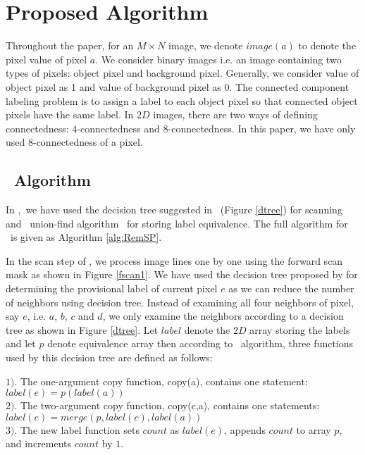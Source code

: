 \vspace{\sectionSpace}
\section{Proposed Algorithm}
\label{sec:proposed_algorithm}

Throughout the paper, for an $M \times N$ image, we denote $image(a)$ to denote the pixel value of pixel $a$.
We consider binary images i.e. an image containing two types of pixels:
object pixel and background pixel. Generally, we consider value of object pixel as 1 and value of background pixel as 0. The connected
component labeling problem is to assign a label to each object pixel so that connected object pixels have the same label.
In $2D$ images, there are two ways of defining connectedness: $4$-connectedness and $8$-connectedness. In this paper, we have 
only used $8$-connectedness of a pixel.


\vspace{\sectionSpace}
\subsection{\nremsp\ Algorithm}

In \nremsp,\ we have used the decision tree suggested in \lrpc\ (Figure \ref{dtree})
for scanning and \rems\ union-find algorithm \remsp\ for storing label
equivalence.
The full algorithm for \nremsp\ is given as Algorithm \ref{alg:RemSP}.



In the scan step of \nremsp, we process image lines one by one using the
forward scan mask as shown in Figure \ref{fscan1}. We have used the decision tree proposed by \cite{Wu2009_LRPC} for 
determining the provisional label of current pixel $e$ as we can reduce the number of neighbors using decision tree. Instead of
examining all four neighbors of pixel, say $e$, i.e. $a$, $b$, $c$ and $d$, we only
examine the neighbors according to a decision tree as shown in Figure
\ref{dtree}\cite{Wu2009_LRPC}.
 Let $label$ denote the $2D$ array storing the labels and let $p$ denote equivalence array 
 then according to \lrpc\ algorithm,
three functions used by this decision tree are defined as follows:

$1)$. The one-argument copy function, copy(a), contains one statement:
					$label(e) = p(label(a))$\\
$2)$. The two-argument copy function, copy(c,a), contains one statements:
				$label(e) = merge(p, label(c), label(a))$\\
$3)$. The new label function sets $count$ as $label(e)$, appends $count$ to array $p$, and increments $count$ by $1$.

